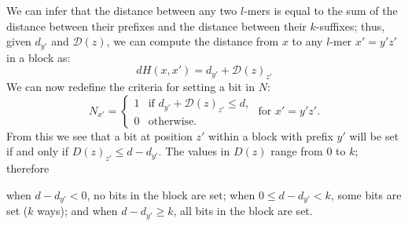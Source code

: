 \documentclass[conference]{IEEEtran}
\begin{document}
\begin{enumerate}[label={\em \arabic*.}]
			We can infer that the distance between any two $l$-mers is equal to the sum of the distance between their prefixes and the distance between their $k$-suffixes; thus, given $d_{y'}$ and $\mathcal{D}(z)$, we can compute the distance from $x$ to any $l$-mer $x' = y'z'$ in a block as:
			\begin{equation}
				dH(x,x') = d_{y'} + \mathcal{D}(z)_{z'}
				\end{equation}
			We can now redefine the criteria for setting a bit in $N$:
			\begin{equation*}
				N_{x'} = \left\{
				\begin{array}{rl}
					1 & \text{if } d_{y'} + \mathcal{D}(z)_{z'} \leq d,\\
					0 & \text{otherwise.}%
				\end{array} \right.
				\text{ for }x' = y'z'.
				\end{equation*}
			From this we see that a bit at position $z'$ within a block with prefix $y'$ will be set if and only if $D(z)_{z'} \leq d-d_{y'}$. The values in $D(z)$ range from 0 to $k$; therefore\newline

				{\small
					\hspace*{5pt} when $d-d_{y'} < 0$, 		\hspace*{24pt}no bits in the block are set;\newline
					\hspace*{5pt} when $0 \leq d-d_{y'} < k$,	\hspace*{6.5pt}some bits are set ($k$ ways); and\newline
					\hspace*{5pt} when $d-d_{y'} \geq k$, 		\hspace*{24pt}all bits in the block are set. \newline}
			

\end{enumerate}
\end{document}
